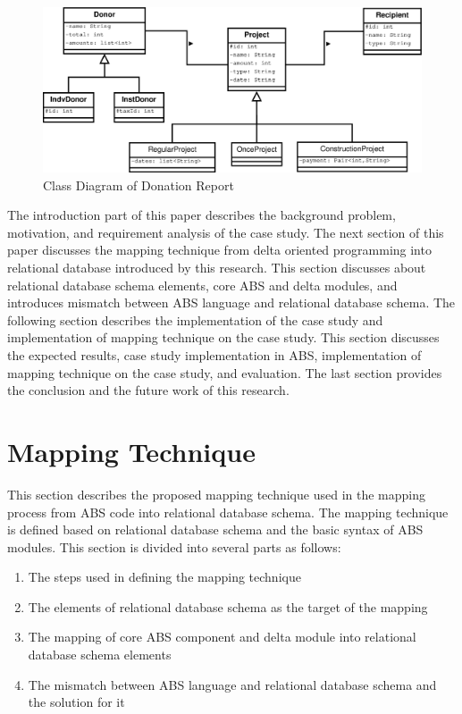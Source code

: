 \documentclass[runningheads,a4paper]{llncs}
\begin{document}
\begin{figure}
	\centering
	\includegraphics[scale=0.3]{ClassDiagram.eps}
	\caption{Class Diagram of Donation Report}
	\label{class diagram}
\end{figure}

The introduction part of this paper describes the background problem, motivation, and requirement analysis of the case study. The next section of this paper discusses the mapping technique from delta oriented programming into relational database introduced by this research. This section discusses about relational database schema elements, core ABS and delta modules, and introduces mismatch between ABS language and relational database schema. The following section describes the implementation of the case study and implementation of mapping technique on the case study. This section discusses the expected results, case study implementation in ABS, implementation of mapping technique on the case study, and evaluation. The last section provides the conclusion and the future work of this research.

\section{Mapping Technique}
This section describes the proposed mapping technique used in the mapping process from ABS code into relational database schema. The mapping technique is defined based on relational database schema and the basic syntax of ABS modules. This section is divided into several parts as follows:
\begin{enumerate}
	\item The steps used in defining the mapping technique
	\item The elements of relational database schema as the target of the mapping
	\item The mapping of core ABS component and delta module into relational database schema elements
	\item The mismatch between ABS language and relational database schema and the solution for it
\end{enumerate}
\end{document}
